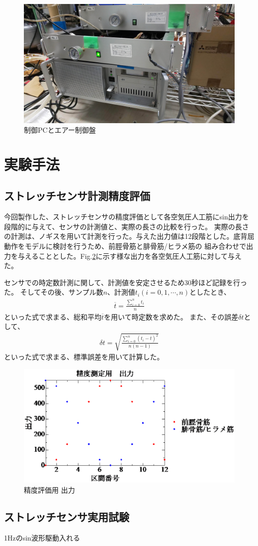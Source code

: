 \begin{figure}[h]
    \begin{center}
     \includegraphics[width=0.65\columnwidth,clip]{./3_analysis/PC.eps}
     \caption{制御PCとエアー制御盤}
     \label{fig:PC}
    \end{center}
\end{figure}

\newpage

\section{実験手法}
\subsection{ストレッチセンサ計測精度評価}
今回製作した、ストレッチセンサの精度評価として各空気圧人工筋にsin出力を段階的に与えて、センサの計測値と、実際の長さの比較を行った。
実際の長さの計測は、ノギスを用いて計測を行った。与えた出力値は12段階とした。底背屈動作をモデルに検討を行うため、前脛骨筋と腓骨筋/ヒラメ筋の
組み合わせで出力を与えることとした。Fig.\ref{output_for_test}に示す様な出力を各空気圧人工筋に対して与えた。

センサでの時定数計測に関して、計測値を安定させるため30秒ほど記録を行った。
そしてその後、サンプル数$n$、計測値$t_i \left(i=0,1,\cdots,n\right)$としたとき、
\begin{eqnarray}
        \overline{t}=\frac{\sum_{i=0}^n t_i}{n}
\end{eqnarray}
といった式で求まる、総和平均$\overline{t}$を用いて時定数を求めた。
また、その誤差$\delta t$として、
\begin{eqnarray}
    \delta t = \sqrt{ \frac{\sum_{i=0}^n \left(t_i-\overline{t}\right)^2}{n(n-1)}}
\end{eqnarray}
といった式で求まる、標準誤差を用いて計算した。

\begin{figure}[h]
    \begin{center}
        \includegraphics[width=0.78\columnwidth,clip]{2_measurement/output/output.eps}
        \caption{精度評価用 出力}
        \label{output_for_test}
    \end{center}
\end{figure}

\subsection{ストレッチセンサ実用試験}
1Hzのsin波形駆動入れる